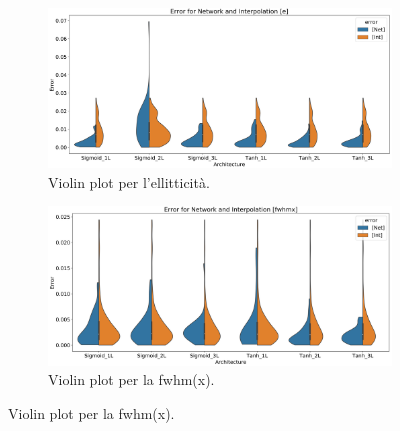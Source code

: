 \documentclass[12pt,a4paper,final]{book}
\begin{document}
\vspace{30mm}
\begin{figure}[!ht]
	\begin{subfigure}{\textwidth}
	    \centering
	    \includegraphics[width=\linewidth]{../figures/violin_plot_e.png}
	    \caption{Violin plot per l'ellitticità.}
	    \label{violin_e}
	\end{subfigure}
	\newline
	\begin{subfigure}{\textwidth}
	    \centering
	    \includegraphics[width=\linewidth]{../figures/violin_plot_fwhmx.png}
	    \caption{Violin plot per la fwhm(x).}
	    \label{violin_fwhmx}
	\end{subfigure}
\end{figure}
\end{document}
